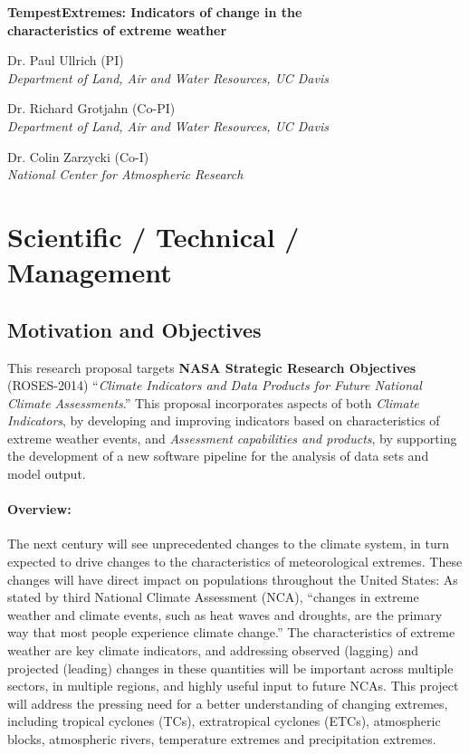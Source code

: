 \documentclass[11pt]{article}
\begin{document}

\begin{center}
{\large \textbf{TempestExtremes: Indicators of change in the \\ characteristics of extreme weather}}

Dr. Paul Ullrich (PI) \\
\textit{Department of Land, Air and Water Resources, UC Davis}

Dr. Richard Grotjahn (Co-PI) \\
\textit{Department of Land, Air and Water Resources, UC Davis}

Dr. Colin Zarzycki (Co-I) \\
\textit{National Center for Atmospheric Research}
\end{center}

\begin{spacing}{-1.0}
\tableofcontents
\end{spacing}

\clearpage

\setcounter{page}{1}

\section{Scientific / Technical / Management}

\subsection{Motivation and Objectives}

This research proposal targets \textbf{NASA Strategic Research Objectives} (ROSES-2014) ``\textit{Climate Indicators and Data Products for Future National Climate Assessments}.''  This proposal incorporates aspects of both \textit{Climate Indicators}, by developing and improving indicators based on characteristics of extreme weather events, and \textit{Assessment capabilities and products}, by supporting the development of a new software pipeline for the analysis of data sets and model output.

\paragraph{Overview:}  The next century will see unprecedented changes to the climate system, in turn expected to drive changes to the characteristics of meteorological extremes. These changes will have direct impact on populations throughout the United States: As stated by third National Climate Assessment (NCA), ``changes in extreme weather and climate events, such as heat waves and droughts, are the primary way that most people experience climate change.'' The characteristics of extreme weather are key climate indicators, and addressing observed (lagging) and projected (leading) changes in these quantities will be important across multiple sectors, in multiple regions, and highly useful input to future NCAs.  This project will address the pressing need for a better understanding of changing extremes, including tropical cyclones (TCs), extratropical cyclones (ETCs), atmospheric blocks, atmospheric rivers, temperature extremes and precipitation extremes. 
\end{document}
